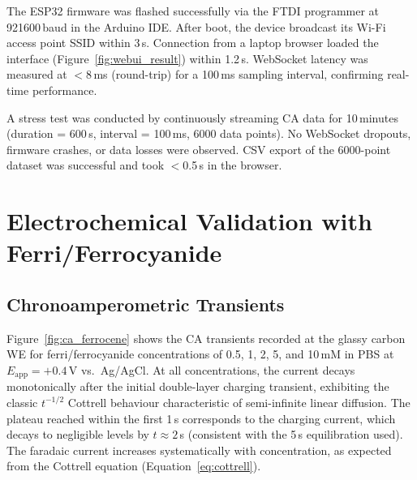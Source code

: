 The ESP32 firmware was flashed successfully via the FTDI programmer at 921600\,baud in the Arduino IDE. After boot, the device broadcast its Wi-Fi access point SSID within 3\,s. Connection from a laptop browser loaded the interface (Figure~\ref{fig:webui_result}) within 1.2\,s. WebSocket latency was measured at $<$8\,ms (round-trip) for a 100\,ms sampling interval, confirming real-time performance.


A stress test was conducted by continuously streaming CA data for 10\,minutes (duration = 600\,s, interval = 100\,ms, 6000 data points). No WebSocket dropouts, firmware crashes, or data losses were observed. CSV export of the 6000-point dataset was successful and took $<$0.5\,s in the browser.

\section{Electrochemical Validation with Ferri/Ferrocyanide}
\label{sec:ferrocene_results}

\subsection{Chronoamperometric Transients}

Figure~\ref{fig:ca_ferrocene} shows the CA transients recorded at the glassy carbon WE for ferri/ferrocyanide concentrations of 0.5, 1, 2, 5, and 10\,mM in PBS at $E_\text{app} = +0.4$\,V vs.\ Ag/AgCl. At all concentrations, the current decays monotonically after the initial double-layer charging transient, exhibiting the classic $t^{-1/2}$ Cottrell behaviour characteristic of semi-infinite linear diffusion. The plateau reached within the first 1\,s corresponds to the charging current, which decays to negligible levels by $t \approx 2$\,s (consistent with the 5\,s equilibration used). The faradaic current increases systematically with concentration, as expected from the Cottrell equation (Equation~\ref{eq:cottrell}).


